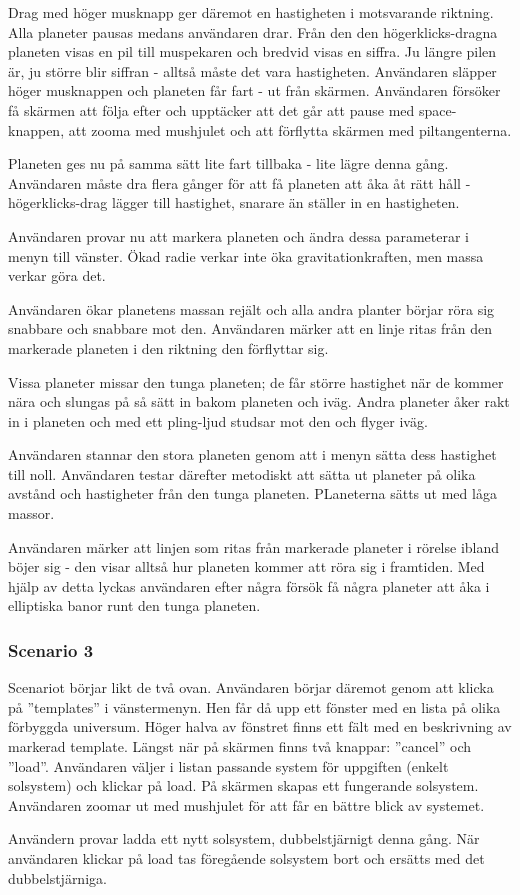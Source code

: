 Drag med höger musknapp ger däremot en hastigheten i motsvarande riktning.
Alla planeter pausas medans användaren drar.
Från den den högerklicks-dragna planeten visas en pil till muspekaren
och bredvid visas en siffra.
Ju längre pilen är, ju större blir siffran - alltså måste det vara hastigheten.
Användaren släpper höger musknappen och planeten får fart - ut från skärmen.
Användaren försöker få skärmen att följa efter och
upptäcker att det går att pause med space-knappen,
att zooma med mushjulet och att förflytta skärmen med piltangenterna.

Planeten ges nu på samma sätt lite fart tillbaka - lite lägre denna gång.
Användaren måste dra flera gånger för att få planeten att
åka åt rätt håll - högerklicks-drag lägger till hastighet,
snarare än ställer in en hastigheten.

Användaren provar nu att markera planeten och 
ändra dessa parameterar i menyn till vänster.
Ökad radie verkar inte öka gravitationkraften,
men massa verkar göra det.

Användaren ökar planetens massan rejält och alla andra planter börjar
röra sig snabbare och snabbare mot den.
Användaren märker att en linje ritas från den markerade planeten
i den riktning den förflyttar sig.

Vissa planeter missar den tunga planeten; de får större hastighet när
de kommer nära och slungas på så sätt in bakom planeten och iväg.
Andra planeter åker rakt in i planeten och med ett pling-ljud
studsar mot den och flyger iväg.

Användaren stannar den stora planeten genom att i menyn
sätta dess hastighet till noll.
Användaren testar därefter metodiskt att sätta ut planeter på olika avstånd
och hastigheter från den tunga planeten.
PLaneterna sätts ut med låga massor.

Användaren märker att linjen som ritas från markerade planeter i rörelse
ibland böjer sig - den visar alltså hur planeten kommer att röra
sig i framtiden.
Med hjälp av detta lyckas användaren efter några försök
få några planeter att åka i elliptiska banor runt den tunga planeten.


\subsubsection{Scenario 3}

Scenariot börjar likt de två ovan.
Användaren börjar däremot genom att klicka på ''templates'' i vänstermenyn.
Hen får då upp ett fönster med en lista på olika förbyggda universum.
Höger halva av fönstret finns ett fält med en beskrivning av markerad
template.
Längst när på skärmen finns två knappar: ''cancel'' och ''load''.
Användaren väljer i listan passande system för uppgiften
(enkelt solsystem) och klickar på load.
På skärmen skapas ett fungerande solsystem.
Användaren zoomar ut med mushjulet för att får en bättre blick av systemet.

Användern provar ladda ett nytt solsystem, dubbelstjärnigt denna gång.
När användaren klickar på load tas föregående solsystem bort och
ersätts med det dubbelstjärniga.
